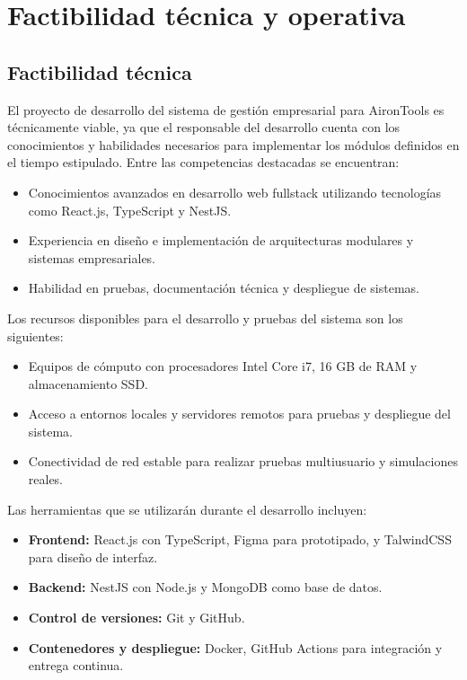 



\section{Factibilidad técnica y operativa}

\subsection{Factibilidad técnica}

El proyecto de desarrollo del sistema de gestión empresarial para AironTools es técnicamente viable, ya que el responsable del desarrollo cuenta con los conocimientos y habilidades necesarios para implementar los módulos definidos en el tiempo estipulado. Entre las competencias destacadas se encuentran:

\begin{itemize}
	\item Conocimientos avanzados en desarrollo web fullstack utilizando tecnologías como React.js, TypeScript y NestJS.
	\item Experiencia en diseño e implementación de arquitecturas modulares y sistemas empresariales.
	\item Habilidad en pruebas, documentación técnica y despliegue de sistemas.
\end{itemize}

Los recursos disponibles para el desarrollo y pruebas del sistema son los siguientes:

\begin{itemize}
	\item Equipos de cómputo con procesadores Intel Core i7, 16 GB de RAM y almacenamiento SSD.
	\item Acceso a entornos locales y servidores remotos para pruebas y despliegue del sistema.
	\item Conectividad de red estable para realizar pruebas multiusuario y simulaciones reales.
\end{itemize}

Las herramientas que se utilizarán durante el desarrollo incluyen:

\begin{itemize}
	\item \textbf{Frontend:} React.js con TypeScript, Figma para prototipado, y TalwindCSS para diseño de interfaz.
	\item \textbf{Backend:} NestJS con Node.js y MongoDB como base de datos.
	\item \textbf{Control de versiones:} Git y GitHub.
	\item \textbf{Contenedores y despliegue:} Docker, GitHub Actions para integración y entrega continua.
\end{itemize}

